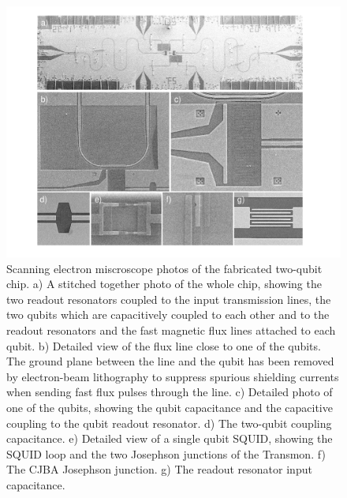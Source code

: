 \begin{figure}[p!]
	\includegraphics[width=1\textwidth]{"./material/figures/2-qubit-processor/processor photos"}
	\caption{Scanning electron miscroscope photos of the fabricated two-qubit chip. a) A stitched together photo of the whole chip, showing the two readout resonators coupled to the input transmission lines, the two qubits which are capacitively coupled to each other and to the readout resonators and the fast magnetic flux lines attached to each qubit. b) Detailed view of the flux line close to one of the qubits. The ground plane between the line and the qubit has been removed by electron-beam lithography to suppress spurious shielding currents when sending fast flux pulses through the line. c) Detailed photo of one of the qubits, showing the qubit capacitance and the capacitive coupling to the qubit readout resonator. d) The two-qubit coupling capacitance. e) Detailed view of a single qubit SQUID, showing the SQUID loop and the two Josephson junctions of the Transmon. f) The CJBA Josephson junction. g) The readout resonator input capacitance.}
	\label{fig:qubit_chip_photos}
\end{figure}

